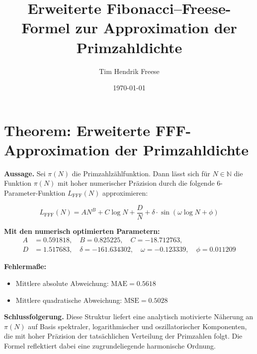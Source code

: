 \documentclass[12pt]{article}
\title{Erweiterte Fibonacci--Freese-Formel zur Approximation der Primzahldichte}
\author{Tim Hendrik Freese}
\date{\today}
\begin{document}
\maketitle

\section*{Theorem: Erweiterte FFF-Approximation der Primzahldichte}

\textbf{Aussage.}
Sei $\pi(N)$ die Primzahlzählfunktion. Dann lässt sich für $N \in \mathbb{N}$ die Funktion $\pi(N)$ mit hoher numerischer Präzision durch die folgende 6-Parameter-Funktion $L_{\text{FFF}}(N)$ approximieren:

\begin{equation}
L_{\text{FFF}}(N) = A N^{B} + C \log N + \frac{D}{N} + \delta \cdot \sin\left( \omega \log N + \phi \right)
\end{equation}

\textbf{Mit den numerisch optimierten Parametern:}
\begin{align*}
A &= 0.591818, \quad
B = 0.825225, \quad
C = -18.712763, \\
D &= 1.517683, \quad
\delta = -161.634302, \quad
\omega = -0.123339, \quad
\phi = 0.011209
\end{align*}

\textbf{Fehlermaße:}
\begin{itemize}
  \item Mittlere absolute Abweichung: $\text{MAE} = 0.5618$
  \item Mittlere quadratische Abweichung: $\text{MSE} = 0.5028$
\end{itemize}

\textbf{Schlussfolgerung.}
Diese Struktur liefert eine analytisch motivierte Näherung an $\pi(N)$ auf Basis spektraler, logarithmischer und oszillatorischer Komponenten, die mit hoher Präzision der tatsächlichen Verteilung der Primzahlen folgt. Die Formel reflektiert dabei eine zugrundeliegende harmonische Ordnung.
\end{document}
